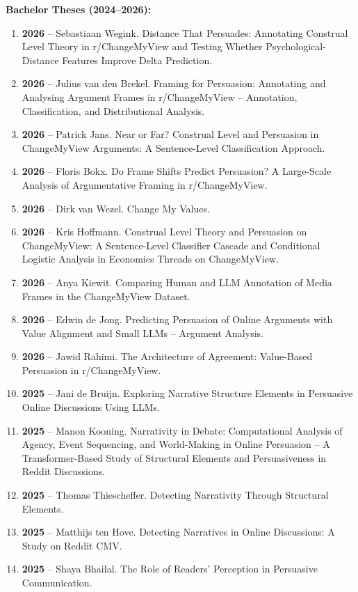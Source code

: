\textbf{Bachelor Theses (2024--2026):}
\begin{enumerate}
\item \textbf{2026} -- Sebastiaan Wegink. Distance That Persuades: Annotating Construal Level Theory in r/ChangeMyView and Testing Whether Psychological-Distance Features Improve Delta Prediction.
\item \textbf{2026} -- Julius van den Brekel. Framing for Persuasion: Annotating and Analysing Argument Frames in r/ChangeMyView -- Annotation, Classification, and Distributional Analysis.
\item \textbf{2026} -- Patrick Jans. Near or Far? Construal Level and Persuasion in ChangeMyView Arguments: A Sentence-Level Classification Approach.
\item \textbf{2026} -- Floris Bokx. Do Frame Shifts Predict Persuasion? A Large-Scale Analysis of Argumentative Framing in r/ChangeMyView.
\item \textbf{2026} -- Dirk van Wezel. Change My Values.
\item \textbf{2026} -- Kris Hoffmann. Construal Level Theory and Persuasion on ChangeMyView: A Sentence-Level Classifier Cascade and Conditional Logistic Analysis in Economics Threads on ChangeMyView.
\item \textbf{2026} -- Anya Kiewit. Comparing Human and LLM Annotation of Media Frames in the ChangeMyView Dataset.
\item \textbf{2026} -- Edwin de Jong. Predicting Persuasion of Online Arguments with Value Alignment and Small LLMs -- Argument Analysis.
\item \textbf{2026} -- Jawid Rahimi. The Architecture of Agreement: Value-Based Persuasion in r/ChangeMyView.
\item \textbf{2025} -- Jani de Bruijn. Exploring Narrative Structure Elements in Persuasive Online Discussions Using LLMs.
\item \textbf{2025} -- Manon Kooning. Narrativity in Debate: Computational Analysis of Agency, Event Sequencing, and World-Making in Online Persuasion -- A Transformer-Based Study of Structural Elements and Persuasiveness in Reddit Discussions.
\item \textbf{2025} -- Thomas Thiescheffer. Detecting Narrativity Through Structural Elements.
\item \textbf{2025} -- Matthijs ten Hove. Detecting Narratives in Online Discussions: A Study on Reddit CMV.
\item \textbf{2025} -- Shaya Bhailal. The Role of Readers' Perception in Persuasive Communication.

\end{enumerate}
